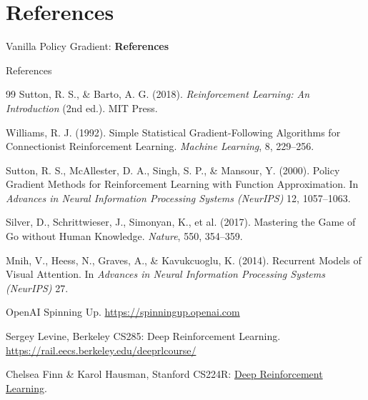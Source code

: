 \section{References}
\begin{frame}{}
    \LARGE Vanilla Policy Gradient: \textbf{References}
\end{frame}

\begin{frame}[allowframebreaks]{References}
    \begin{thebibliography}{99}
        Sutton, R. S., \& Barto, A. G. (2018).
        \newblock \emph{Reinforcement Learning: An Introduction} (2nd ed.). MIT Press.

        Williams, R. J. (1992).
        \newblock Simple Statistical Gradient-Following Algorithms for Connectionist Reinforcement Learning.
        \newblock \emph{Machine Learning}, 8, 229--256.

        Sutton, R. S., McAllester, D. A., Singh, S. P., \& Mansour, Y. (2000).
        \newblock Policy Gradient Methods for Reinforcement Learning with Function Approximation.
        \newblock In \emph{Advances in Neural Information Processing Systems (NeurIPS)} 12, 1057--1063.

        Silver, D., Schrittwieser, J., Simonyan, K., et al. (2017).
        \newblock Mastering the Game of Go without Human Knowledge.
        \newblock \emph{Nature}, 550, 354--359.

        Mnih, V., Heess, N., Graves, A., \& Kavukcuoglu, K. (2014).
        \newblock Recurrent Models of Visual Attention.
        \newblock In \emph{Advances in Neural Information Processing Systems (NeurIPS)} 27.

        OpenAI Spinning Up.
        \newblock \url{https://spinningup.openai.com}

        Sergey Levine, Berkeley CS285: Deep Reinforcement Learning.
        \newblock \url{https://rail.eecs.berkeley.edu/deeprlcourse/}

        Chelsea Finn \& Karol Hausman, Stanford CS224R: \href{http://cs224r.stanford.edu/}{Deep Reinforcement Learning}.
    \end{thebibliography}
\end{frame}
